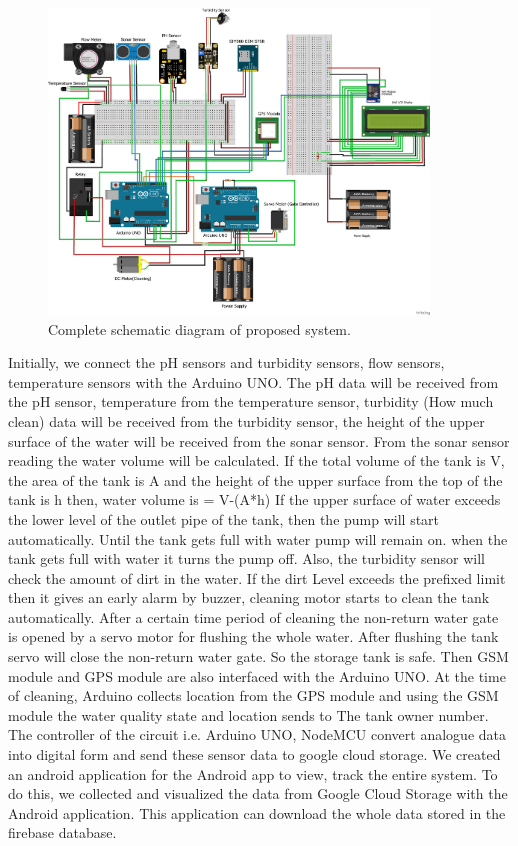 \begin{figure}[H]
\centering
\includegraphics[width=0.9\textwidth]{figures/Final Project Water_bb.png}
\caption{Complete schematic diagram of proposed system.}
\label{SchemaDiagram}
\end{figure}
Initially, we connect the pH sensors and turbidity sensors, flow sensors, temperature sensors with the Arduino UNO. The pH data will be received from the pH sensor, temperature from the temperature sensor, turbidity (How much clean) data will be received from the turbidity sensor, the height of the upper surface of the water will be received from the sonar sensor. From the sonar sensor reading the water volume will be calculated. If the total volume of the tank is V, the area of the tank is A and the height of the upper surface from the top of the tank is h then, water volume is = V-(A*h)
If the upper surface of water exceeds the lower level of the outlet pipe of the tank, then the pump will start automatically. Until the tank gets full with water pump will remain on. when the tank gets full with water it turns the pump off. Also, the turbidity sensor will check the amount of dirt in the water. If the dirt Level exceeds the prefixed limit then it gives an early alarm by buzzer, cleaning motor starts to clean the tank automatically. After a certain time period of cleaning the non-return water gate is opened by a servo motor for flushing the whole water. After flushing the tank servo will close the non-return water gate. So the storage tank is safe. Then GSM module and GPS module are also interfaced with the Arduino UNO. At the time of cleaning, Arduino collects location from the GPS module and using the GSM module the water quality state and location sends to The tank owner number. The controller of the circuit i.e. Arduino UNO, NodeMCU convert analogue data into digital form and send these sensor data to google cloud storage. We created an android application for the Android app to view, track the entire system. To do this, we collected and visualized the data from Google Cloud Storage with the Android application. This application can download the whole data stored in the firebase database.
